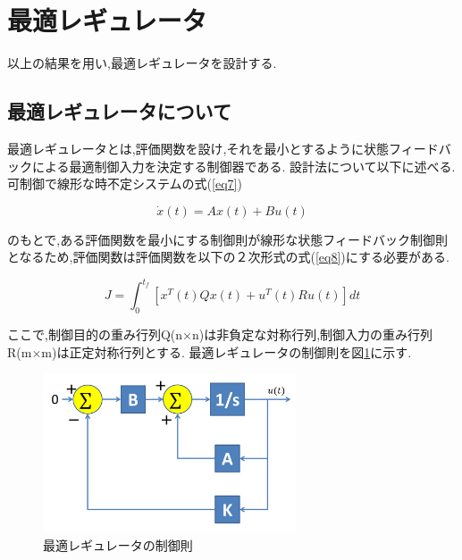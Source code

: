 \documentclass[12pt,oneside]{sotsuken_paper}
\begin{document}
\section{最適レギュレータ}
以上の結果を用い,最適レギュレータを設計する.

\subsection{最適レギュレータについて}

最適レギュレータとは,評価関数を設け,それを最小とするように状態フィードバックによる最適制御入力を決定する制御器である.
設計法について以下に述べる.
可制御で線形な時不定システムの式(\ref{eq7})

\begin{equation}
	\dot{x}(t) = Ax(t)+Bu(t)
	\label{eq10}
\end{equation}

のもとで,ある評価関数を最小にする制御則が線形な状態フィードバック制御則となるため,評価関数は評価関数を以下の２次形式の式(\ref{eq8})にする必要がある.

\begin{equation}
	J = \int^{t_f}_0 [x^T(t)Qx(t)+u^T(t)Ru(t)]dt
	\label{eq11}
\end{equation}

ここで,制御目的の重み行列Q(n×n)は非負定な対称行列,制御入力の重み行列R(m×m)は正定対称行列とする.\cite{regulator}
最適レギュレータの制御則を図\ref{fig:regyureta}に示す.

\begin{figure}[htbp]
	\begin{center}
		\includegraphics[width=75mm]{image/susiki/regulator.png}
		\caption{最適レギュレータの制御則}
		\label{fig:regyureta}
	\end{center}
\end{figure}
\end{document}
